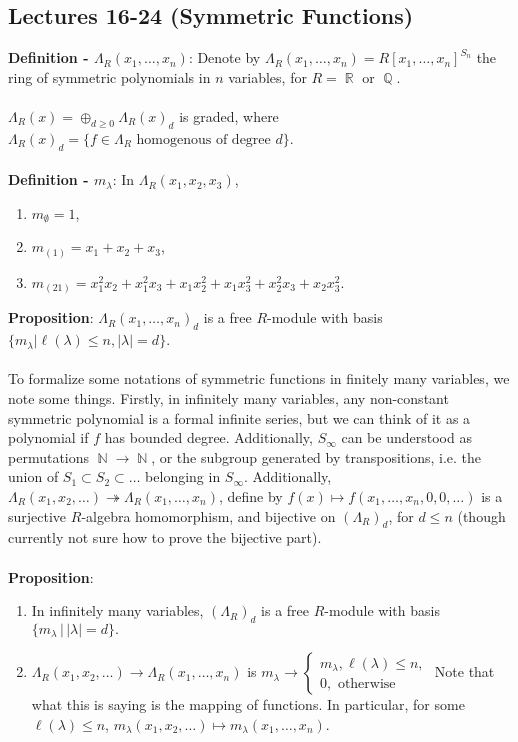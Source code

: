 \documentclass{article}
\DeclareMathOperator{\N}{\mathbb{N}}
\DeclareMathOperator{\Q}{\mathbb{Q}}
\DeclareMathOperator{\R}{\mathbb{R}}
\begin{document}
\subsection*{Lectures 16-24 (Symmetric Functions)}
\textbf{Definition - $\Lambda_R(x_1, \dots, x_n)$}: Denote by $\Lambda_R(x_1, \dots, x_n) = R[x_1, \dots, x_n]^{S_n}$ the ring of symmetric polynomials in $n$ variables, for $R = \R$ or $\Q$. \\ \\
$\Lambda_R(x) = \oplus_{d \geq 0} \Lambda_R(x)_d$ is graded, where  $\Lambda_R(x)_d = \{f \in \Lambda_R \text{ homogenous of degree } d\}$. \\ \\
\textbf{Definition - $m_\lambda$}: In $\Lambda_R(x_1, x_2, x_3)$, \begin{enumerate}
    \item $m_\emptyset = 1$,
    \item $m_{(1)} = x_1 + x_2 + x_3$,
    \item $m_{(21)} = x_1^2x_2 + x_1^2x_3 + x_1 x_2^2 + x_1 x_3^2 + x_2^2 x_3 + x_2 x_3^2$.
\end{enumerate} $ $ \\
\textbf{Proposition}: $\Lambda_R(x_1, \dots, x_n)_d$ is a free $R$-module with basis $\{m_\lambda| \ell(\lambda) \leq n, |\lambda| = d\}$. \\ \\
To formalize some notations of symmetric functions in finitely many variables, we note some things. Firstly, in infinitely many variables, any non-constant symmetric polynomial is a formal infinite series, but we can think of it as a polynomial if $f$ has bounded degree. Additionally, $S_\infty$ can be understood as permutations $\N \rightarrow \N$, or the subgroup generated by transpositions, i.e. the union of $S_1 \subset S_2 \subset \dots$ belonging in $S_\infty$. Additionally, $\Lambda_R(x_1, x_2, \dots) \twoheadrightarrow \Lambda_R(x_1, \dots, x_n)$, define by $f(x) \mapsto f(x_1, \dots, x_n, 0, 0, \dots)$ is a surjective $R$-algebra homomorphism, and bijective on $(\Lambda_R)_d$, for $d \leq n$ (though currently not sure how to prove the bijective part). \\ \\
\textbf{Proposition}: \begin{enumerate}
    \item In infinitely many variables, $(\Lambda_R)_d$ is a free $R$-module with basis $\{m_\lambda \, | \, |\lambda| = d\}.$
    \item $\Lambda_R(x_1, x_2, \dots) \rightarrow \Lambda_R(x_1, \dots, x_n)$ is $m_\lambda \rightarrow \begin{cases}
        m_\lambda, \ell(\lambda) \leq n, \\
        0, \text{ otherwise}
    \end{cases}$ Note that what this is saying is the mapping of functions. In particular, for some $\ell(\lambda) \leq n$, $m_\lambda(x_1, x_2, \dots) \mapsto m_\lambda(x_1, \dots, x_n)$.
\end{enumerate} $ $ \\
\end{document}
